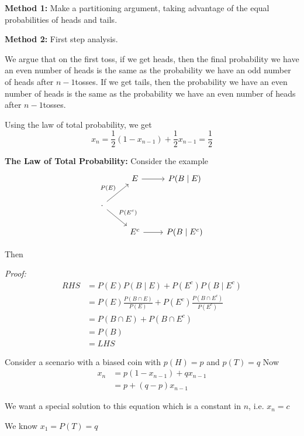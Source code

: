 \documentclass[12pt]{report}
\newenvironment*{tbox}[2][gray]{
    \begin{tcolorbox}[
        parbox=false,
        colback=#1!5!white,
        colframe=#1!75!black,
        breakable,
        title={#2}
    ]}
    {\end{tcolorbox}}
\begin{document}
    \textbf{Method 1:} Make a partitioning argument, taking advantage of the equal probabilities of heads and tails.

    \textbf{Method 2:} First step analysis.
    
    We argue that on the first toss, if we get heads, then the final probability we have an even number of heads is the same as the probability we have an odd number of heads after $n-1$tosses. If we get tails, then the probability we have an even number of heads is the same as the probability we have an even number of heads after $n-1$tosses.

    Using the law of total probability, we get
    \[x_n = \frac{1}{2}(1 - x_{n-1}) + \frac{1}{2}x_{n-1} = \frac{1}{2}\]

    \textbf{The Law of Total Probability:} 
    Consider the example 
    \[\begin{tikzcd}
        & E \arrow[r] &  P(B \; | \; E)\\
        \cdot \arrow[ur, "P(E)"] \arrow[dr, "P(E^c)"] \\
        & E^c \arrow[r] & P(B \; | \; E^c)
    \end{tikzcd}\]

    Then 
    \begin{tbox}{\textbf{Law of total Probability:}
        \[P(B) = P(E) P(B \; | \; E) + P(E^c)P(B \; | \; E^c)\]}
        \emph{Proof:} 
        \begin{align*}
            RHS &= P(E)P(B \; | \; E) + P(E^c)P(B \; | \; E^c)\\
            &= P(E)\frac{P(B \cap E)}{P(E)} + P(E^c)\frac{P(B \cap E^c)}{P(E^c)}\\
            &= P(B \cap E) + P(B \cap E^c)\\
            &= P(B)\\ 
            &= LHS
        \end{align*}
    \end{tbox}

    Consider a scenario with a biased coin with $p(H) = p$ and $p(T) = q$ Now 
    \begin{align*}
        x_n &= p(1 - x_{n-1}) + qx_{n-1}\\ 
        &= p + (q - p)x_{n-1}
    \end{align*}

    We want a special solution to this equation which is a constant in $n$, i.e. $x_n = c$ 

    We know $x_1 = P(T) = q$ 
\end{document}
